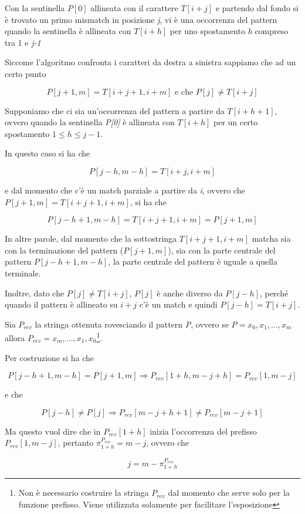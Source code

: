 Con la sentinella $P[0]$ allineata con il carattere $T[i+j]$ e partendo dal fondo si è trovato un primo mismatch in posizione \emph{j}, vi è una occorrenza del pattern quando la
sentinella è allineata con $T[i+h]$ per uno spostamento
\emph{h} compreso tra 1 e \emph{j-1}

Siccome l'algoritmo confronta i caratteri da destra a sinistra sappiamo
che ad un certo punto

$$
P[j + 1, m] = T[i + j + 1, i + m] \text{ e che } P[j] \neq T[i + j]
$$

Supponiamo che ci sia un'occorrenza del pattern a partire da $ T[i+h+1] $, ovvero quando la sentinella \textit{P[0]} è allineata con $ T[i+h] $ per un certo spostamento $ 1 \leq h \leq j -1 $.

In questo caso si ha che

$$
P[j-h, m-h] = T[i+j,i+m]
$$

e dal momento che c'è un match parziale a partire da \textit{i}, ovvero che$ P[j + 1, m] =  T[i + j + 1, i + m]$, si ha che 

$$
P[j - h +1,m -h] = T[i+j+1, i+m]  = P[j+1,m]
$$

In altre parole, dal momento che la sottostringa $ T[i+j+1, i+m] $ matcha sia con la terminazione del pattern ($ P[j+1,m] $), sia con la parte centrale del pattern $ P[j - h +1,m -h] $, la parte centrale del pattern è uguale a quella terminale.

Inoltre, dato che $ P[j] \neq T[i+j] $, $ P[j] $ è anche diverso da $ P[j-h] $, perché quando il pattern è allineato su $ i+j $ c'è un match e quindi $ P[j-h] = T[i+j] $.

Sia $ P_{rev} $ la stringa ottenuta rovesciando il pattern \textit{P}, ovvero se $ P = x_0,x_1,\ldots , x_m $ allora $ P_{rev} = x_m, \ldots, x_1, x_0 $\footnote{Non è necessario costruire la stringa $ P_{rev} $ dal momento che serve solo per la funzione prefisso. Viene utilizzata solamente per facilitare l'esposizione}.

Per costruzione si ha che

$$
P[j-h +1, m-h] = P[j+1,m] \Rightarrow P_{rev}[1+h, m-j+h] = P_{rev}[1,m-j]
$$

e che

$$
P[j-h] \neq P[j] \Rightarrow P_{rev}[m-j+h+1] \neq P_{rev}[m-j+1]
$$

Ma questo vuol dire che in $ P_{rev}[1+h] $ inizia l'occorrenza del prefisso $ P_{rev}[1,m-j] $, pertanto $\pi_{1+h}^{P_{rev}} = m -j$, ovvero che 

$$
j = m - \pi_{1+h}^{P_{rev}} 
$$

